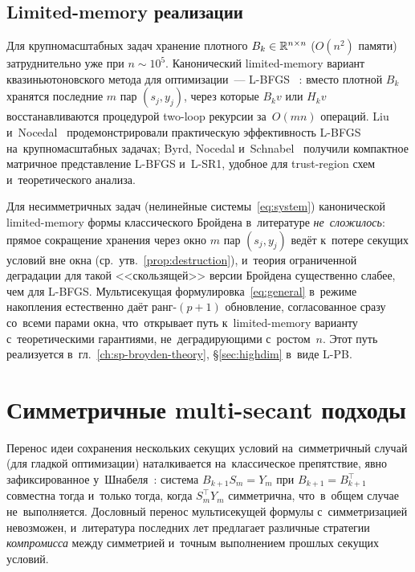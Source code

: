 \subsection{Limited-memory реализации}

Для крупномасштабных задач хранение плотного $B_k\in\mathbb{R}^{n\times n}$
($O(n^2)$ памяти) затруднительно уже при $n\sim 10^5$. Канонический
limited-memory вариант квазиньютоновского метода для оптимизации~---
L-BFGS ~\cite{lbfgs}: вместо плотной $B_k$ хранятся
последние $m$ пар $(s_j, y_j)$, через которые $B_k v$ или $H_k v$
восстанавливаются процедурой two-loop рекурсии за~$O(mn)$ операций.
Liu и~Nocedal~\cite{liu1989} продемонстрировали практическую
эффективность L-BFGS на~крупномасштабных задачах; Byrd, Nocedal
и~Schnabel~\cite{byrd1994} получили компактное матричное
представление L-BFGS и~L-SR1, удобное для trust-region схем
и~теоретического анализа.

Для несимметричных задач (нелинейные системы~\eqref{eq:system})
канонической limited-memory формы классического Бройдена в~литературе
\emph{не~сложилось}: прямое сокращение хранения через окно $m$ пар
$(s_j, y_j)$ ведёт к~потере секущих условий вне окна (ср.\
утв.~\ref{prop:destruction}), и~теория ограниченной деградации
для такой <<скользящей>> версии Бройдена существенно слабее, чем
для L-BFGS. Мультисекущая формулировка~\eqref{eq:general} в~режиме
накопления естественно даёт ранг-$(p{+}1)$ обновление, согласованное
сразу со~всеми парами окна, что~открывает путь к~limited-memory
варианту с~теоретическими гарантиями, не~деградирующими с~ростом~$n$.
Этот путь реализуется в~гл.~\ref{ch:sp-broyden-theory},
\S\ref{sec:highdim} в~виде L-PB.


\section{Симметричные multi-secant подходы}\label{sec:ch1_sym}

Перенос идеи сохранения нескольких секущих условий на~симметричный
случай (для гладкой оптимизации) наталкивается на~классическое
препятствие, явно зафиксированное у~Шнабеля~\cite{schnabel1983}:
система $B_{k+1} S_m = Y_m$ при $B_{k+1} = B_{k+1}^\top$ совместна
тогда и~только тогда, когда $S_m^\top Y_m$ симметрична, что~в~общем
случае не~выполняется. Дословный перенос мультисекущей формулы
с~симметризацией невозможен, и~литература последних лет предлагает
различные стратегии \emph{компромисса} между симметрией и~точным
выполнением прошлых секущих условий.


